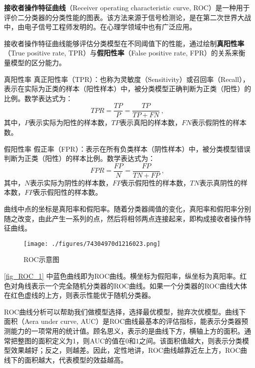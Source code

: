 

\textbf{接收者操作特征曲线}（Receiver operating characteristic curve, ROC）是一种用于评价二分类器的分类性能的图表。该方法来源于信号检测论，是在第二次世界大战中，由电子信号工程师发明的。在心理学领域中也有广泛应用。

接收者操作特征曲线能够评估分类模型在不同阈值下的性能，通过绘制\textbf{真阳性率}（True positive rate, TPR）与\textbf{假阳性率}（False positive rate, FPR）的关系来衡量模型的区分能力。

\begin{definition}{真阳性率}
真正阳性率（TPR）：也称为灵敏度（Sensitivity）或召回率（Recall），表示在实际为正类的样本（阳性样本）中，被分类模型正确判断为正类（阳性）的比例。数学表达式为：
\begin{equation}
TPR=\frac{TP}{P}=\frac{TP}{TP+FN}~,
\end{equation}
其中，$P$表示实际为阳性的样本数，$TP$表示真阳的样本数，$FN$表示假阴性的样本数。
\end{definition}

\begin{definition}{假阳性率}
假正率（FPR）：表示在所有负类样本（阴性样本）中，被分类模型错误判断为正类（阳性）的样本比例。数学表达式为：
\begin{equation}
FPR=\frac{FP}{N}=\frac{FP}{TN+FP}~,
\end{equation}
其中，$N$表示实际为阴性的样本数，$FP$表示假阳性的样本数，$TN$表示真阴性的样本数，$FP$表示假阳性的样本数。
\end{definition}

曲线中点的坐标是真阳率和假阳率。随着分类器阈值的变化，真阳率和假阳率分别随之改变，由此产生一系列的点，然后将相邻两点连接起来，即构成接收者操作特征曲线。

\begin{figure}[ht]
\centering
\texttt{[image: ./figures/74304970d1216023.png]}
\caption{ROC示意图} \label{fig_ROC_1}
\end{figure}
\autoref{fig_ROC_1} 中蓝色曲线即为ROC曲线。横坐标为假阳率，纵坐标为真阳率。红色对角线表示一个完全随机分类器的ROC曲线。如果一个分类器的ROC曲线大体在红色虚线的上方，则表示性能优于随机分类器。

ROC曲线分析可以帮助我们做模型选择，选择最优模型，抛弃次优模型。曲线下面积（Aera under curve, AUC）是ROC曲线最基本的评估指标，能表示分类器预测能力的一项常用的统计值。顾名思义，表示的是曲线下方，横轴上方的面积。通常把整图的面积定义为1，则AUC的值在$0$和$1$之间。该面积值越大，则表示分类模型效果越好；反之，则越差。因此，定性地讲，ROC曲线越靠近左上方，ROC曲线下的面积越大，代表模型的效益越高。

